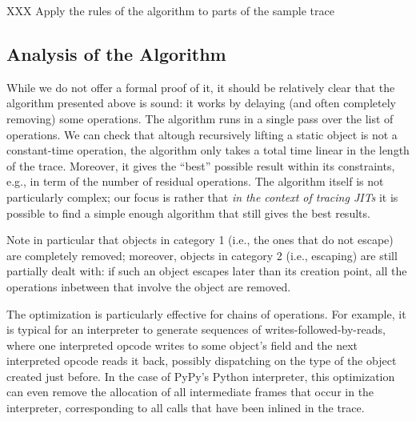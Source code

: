 \documentclass[preprint]{sigplanconf}
\newcommand\ie{i.e.,\xspace}
\newcommand\eg{e.g.,\xspace}
\begin{document}
XXX Apply the rules of the algorithm to parts of the sample trace


\subsection{Analysis of the Algorithm}
\label{sub:analysis}

While we do not offer a formal proof of it, it should be relatively clear
that the algorithm presented above is sound: it works by delaying (and
often completely removing) some operations.  The algorithm runs in a
single pass over the list of operations.  We can check that altough
recursively lifting a static object is not a constant-time operation,
the algorithm only takes a total time linear in the length of the trace.
Moreover, it gives the ``best'' possible result within its constraints,
\eg in term of the number of residual operations.  The
algorithm itself is not particularly complex; our focus is
rather that \emph{in the context of tracing JITs} it is possible to find a
simple enough algorithm that still gives the best results.

Note in particular that objects in category 1 (\ie the ones that do
not escape) are completely removed; moreover, objects in category 2
(\ie escaping) are still partially dealt with: if such an object
escapes later than its creation point, all the operations inbetween that
involve the object are removed.

The optimization is particularly effective for chains of operations.
For example, it is typical for an interpreter to generate sequences of
writes-followed-by-reads, where one interpreted opcode writes to some
object's field and the next interpreted opcode reads it back, possibly
dispatching on the type of the object created just before.  In the case
of PyPy's Python interpreter, this optimization can even remove the
allocation of all intermediate frames that occur in the interpreter,
corresponding to all calls that have been inlined in the trace.




\end{document}
